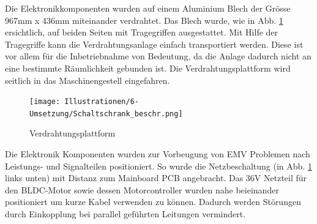 Die Elektronikkomponenten wurden auf einem Aluminium Blech der Grösse 967mm x 436mm miteinander verdrahtet. Das Blech wurde, wie in Abb. \ref{fig:Schaltschrank} ersichtlich, auf beiden Seiten mit Tragegriffen ausgestattet. Mit Hilfe der Tragegriffe kann die Verdrahtungsanlage einfach transportiert werden. Diese ist vor allem für die Inbetriebnahme von Bedeutung, da die Anlage dadurch nicht an eine bestimmte Räumlichkeit gebunden ist. Die Verdrahtungsplattform wird seitlich in das Maschinengestell eingefahren.

\begin{figure}[H]
	\texttt{[image: Illustrationen/6-Umsetzung/Schaltschrank\_beschr.png]}
	\caption{Verdrahtungsplattform}
	\label{fig:Schaltschrank}
\end{figure}

Die Elektronik Komponenten wurden zur Vorbeugung von EMV Problemen nach Leistungs- und Signalteilen positioniert. So wurde die Netzbeschaltung (in Abb. \ref{fig:Schaltschrank} links unten) mit Distanz zum Mainboard PCB angebracht. Das 36V Netzteil für den BLDC-Motor sowie dessen Motorcontroller wurden nahe beieinander positioniert um kurze Kabel verwenden zu können. Dadurch werden Störungen durch Einkopplung bei parallel geführten Leitungen vermindert.